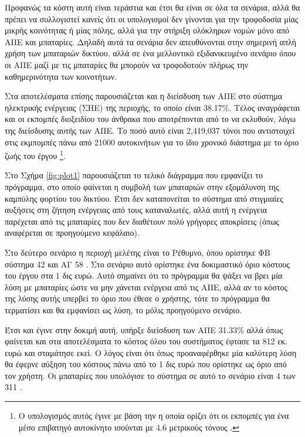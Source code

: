 \documentclass[12pt]{report}
\begin{document}
Προφανώς τα κόστη αυτή είναι τεράστια και έτσι θα είναι σε όλα τα σενάρια, αλλά θα πρέπει να συλλογιστεί κανείς ότι οι υπολογισμοί δεν γίνονται για την τροφοδοσία μίας μικρής κοινότητας ή μίας πόλης, αλλά για την στήριξη ολόκληρων
νομών μόνο από ΑΠΕ και μπαταρίες. Δηλαδή αυτά τα σενάρια δεν απευθύνονται στην σημερινή απλή χρήση των μπαταριών δικτύου, αλλά σε ένα μελλοντικό εξιδανικευμένο σενάριο όπου οι ΑΠΕ μαζί με τις μπαταρίες θα μπορούν να τροφοδοτούν
πλήρως την καθημερινότητα των κοινοτήτων.

Στα αποτελέσματα επίσης παρουσιάζεται και η διείσδυση των ΑΠΕ στο σύστημα ηλεκτρικής ενέργειας (ΣΗΕ) της περιοχής, το οποίο είναι 38.17\%. Τέλος αναγράφεται και οι εκπομπές διοξειδίου του άνθρακα που αποτρέπονται από το να
εκλυθούν, λόγω της διείσδυσης αυτής των ΑΠΕ. Το ποσό αυτό είναι 2,419,037 τόνοι {} που αντιστοιχεί στις εκμπομπές πάνω από 21000 αυτοκινήτων για το ίδιο χρονικό διάστημα με το όριο ζωής του έργου
\footnote{Ο υπολογισμός αυτός έγινε με βάση την {} η οποία ορίζει ότι οι εκπομπές {} για ένα μέσο επιβατηγό αυτοκίνητο ισούνται με 4.6 
μετρικούς τόνους {}.}.

Στο Σχήμα \ref{fig:plot1} παρουσιάζεται το τελικό διάγραμμα που εμφανίζει το πρόγραμμα, στο οποίο φαίνεται η συμβολή των μπαταριών στην εξομάλυνση της καμπύλης φορτίου του δικτύου. Έτσι δεν καταπονείται το σύστημα από
στιγμιαίες αυξήσεις στη ζήτηση ενέργειας από τους καταναλωτές, αλλά αυτή η ενέργεια παρέχεται από τις μπαταρίες που δεν διαθέτουν πολύ γρήγορες αποκρίσεις (όπως αναφέρεται σε προηγούμενο κεφάλαιο).

\begin{center}
\end{center}

Στο δεύτερο σενάριο η περιοχή μελέτης είναι το Ρέθυμνο, όπου ορίστηκε ΦΒ σύστημα 42 {} και ΑΓ 58 {}. Στο σενάριο αυτό ορίστηκε ένα δοκιμαστικό όριο κόστους του έργου στα 1 δις ευρώ. Αυτό σημαίνει ότι
το πρόγραμμα θα ψάξει να βρει μία λύση με μπαταρίες ώστε να μην χάνεται ενέργεια από τις ΑΠΕ, αλλά αν το κόστος της λύσης αυτής υπερβεί το όριο που έθεσε ο χρήστης, τότε το πρόγραμμα θα τερματίσει και θα εμφανίσει ως λύση, το
μόλις προηγούμενο σενάριο.

Έτσι και έγινε στην δοκιμή αυτή, υπήρξε διείσδυση των ΑΠΕ 31.33\% αλλά όπως φαίνεται και στα αποτελέσματα το κόστος όλου του συστήματος έφτασε τα 812 εκ. ευρώ και σταμάτησε εκεί. Ο λόγος είναι ότι όπως προαναφέρθηκε μία καλύτερη
λύση θα έφερνε αύξηση του κόστους πάνω από το 1 δις ευρώ που ορίστηκε ως όριο από τον χρήστη. Οι μπαταρίες που υπολόγισε το σύστημα σε αυτό το σενάριο είναι 4 {} των 311 {}.
\end{document}
